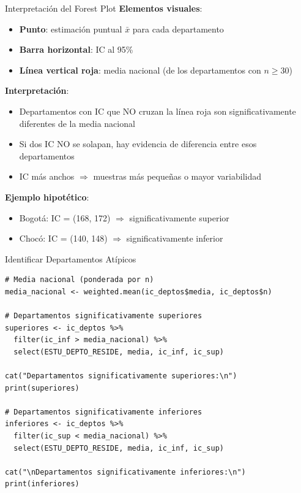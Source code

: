 \documentclass[aspectratio=169, 11pt]{beamer}
\begin{document}
\begin{frame}{Interpretación del Forest Plot}
\textbf{Elementos visuales}:
\begin{itemize}
  \item \textbf{Punto}: estimación puntual $\bar{x}$ para cada departamento
  \item \textbf{Barra horizontal}: IC al 95\%
  \item \textbf{Línea vertical roja}: media nacional (de los departamentos con $n \geq 30$)
\end{itemize}

\vspace{0.3cm}
\textbf{Interpretación}:
\begin{itemize}
  \item Departamentos con IC que NO cruzan la línea roja son significativamente diferentes de la media nacional
  \item Si dos IC NO se solapan, hay evidencia de diferencia entre esos departamentos
  \item IC más anchos $\Rightarrow$ muestras más pequeñas o mayor variabilidad
\end{itemize}

\vspace{0.3cm}
\textbf{Ejemplo hipotético}:
\begin{itemize}
  \item Bogotá: IC = (168, 172) $\Rightarrow$ significativamente superior
  \item Chocó: IC = (140, 148) $\Rightarrow$ significativamente inferior
\end{itemize}
\end{frame}

\begin{frame}[fragile]{Identificar Departamentos Atípicos}
\begin{lstlisting}
# Media nacional (ponderada por n)
media_nacional <- weighted.mean(ic_deptos$media, ic_deptos$n)

# Departamentos significativamente superiores
superiores <- ic_deptos %>%
  filter(ic_inf > media_nacional) %>%
  select(ESTU_DEPTO_RESIDE, media, ic_inf, ic_sup)

cat("Departamentos significativamente superiores:\n")
print(superiores)

# Departamentos significativamente inferiores
inferiores <- ic_deptos %>%
  filter(ic_sup < media_nacional) %>%
  select(ESTU_DEPTO_RESIDE, media, ic_inf, ic_sup)

cat("\nDepartamentos significativamente inferiores:\n")
print(inferiores)
\end{lstlisting}
\end{frame}
\end{document}
